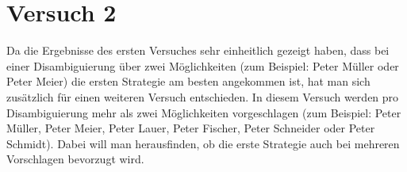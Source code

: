 \documentclass[12pt,a4paper]{scrartcl}
\begin{document}

\section{Versuch 2}
\label{Verusch2}
Da die Ergebnisse des ersten Versuches sehr einheitlich gezeigt haben, dass bei einer Disambiguierung über zwei Möglichkeiten (zum Beispiel: Peter Müller oder Peter Meier) die ersten Strategie am besten angekommen ist, hat man sich zusätzlich für einen weiteren Versuch entschieden. In diesem Versuch werden pro Disambiguierung mehr als zwei Möglichkeiten vorgeschlagen (zum Beispiel: Peter Müller, Peter Meier, Peter Lauer, Peter Fischer, Peter Schneider oder Peter Schmidt). Dabei will man herausfinden, ob die erste Strategie auch bei mehreren Vorschlagen bevorzugt wird.
\end{document}
